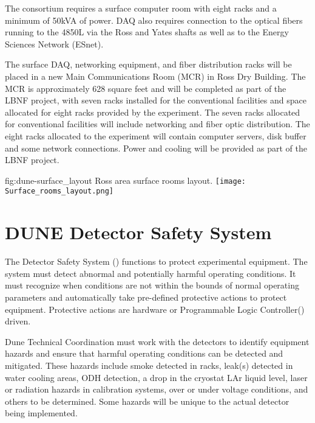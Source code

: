 The  consortium requires a surface computer room with eight
racks and a minimum of 50kVA of power.  DAQ also requires connection
to the optical fibers running to the 4850L via the Ross and Yates
shafts as well as to the Energy Sciences Network (ESnet).

The surface DAQ, networking equipment, and fiber distribution racks
will be placed in a new Main Communications Room (MCR) in Ross Dry
Building.  The MCR is approximately 628 square feet and will be
completed as part of the LBNF project, with seven racks installed for
the conventional facilities and space allocated for eight racks
provided by the experiment.  The seven racks allocated for
conventional facilities will include networking and fiber optic
distribution.  The eight racks allocated to the experiment will
contain computer servers, disk buffer and some network connections.
Power and cooling will be provided as part of the LBNF project.
\begin{dunefigure}{fig:dune-surface_layout}
  {Ross area surface rooms layout.}
  \texttt{[image: Surface\_rooms\_layout.png]}
\end{dunefigure}


\section{DUNE Detector Safety System}
\label{sec:fdsp-coord-det-safety}


The  Detector Safety System () functions to
protect experimental equipment.  The system must detect abnormal and
potentially harmful operating conditions.  It must recognize when
conditions are not within the bounds of normal operating parameters
and automatically take pre-defined protective actions to protect
equipment.  Protective actions are hardware or Programmable Logic
Controller() driven.

Dune Technical Coordination must work with the detectors to identify
equipment hazards and ensure that harmful operating conditions can be
detected and mitigated.  These hazards include smoke detected in
racks, leak(s) detected in water cooling areas, ODH detection, a drop
in the cryostat LAr liquid level, laser or radiation hazards in
calibration systems, over or under voltage conditions, and others to
be determined.  Some hazards will be unique to the actual detector
being implemented.

